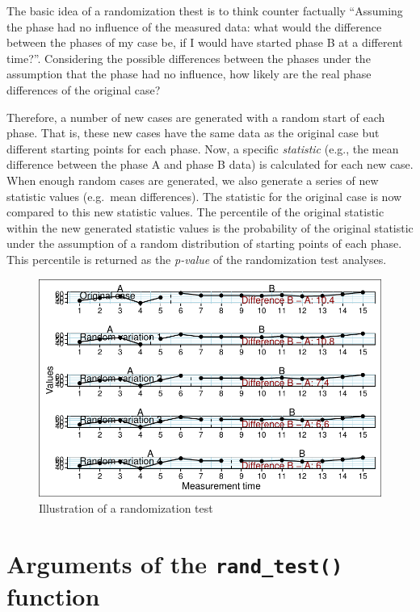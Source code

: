 \documentclass[
  letterpaper,
  DIV=11,
  numbers=noendperiod]{scrreprt}
\begin{document}
The basic idea of a randomization thest is to think counter factually
``Assuming the phase had no influence of the measured data: what would
the difference between the phases of my case be, if I would have started
phase B at a different time?''. Considering the possible differences
between the phases under the assumption that the phase had no influence,
how likely are the real phase differences of the original case?

Therefore, a number of new cases are generated with a random start of
each phase. That is, these new cases have the same data as the original
case but different starting points for each phase. Now, a specific
\emph{statistic} (e.g., the mean difference between the phase A and
phase B data) is calculated for each new case. When enough random cases
are generated, we also generate a series of new statistic values
(e.g.~mean differences). The statistic for the original case is now
compared to this new statistic values. The percentile of the original
statistic within the new generated statistic values is the probability
of the original statistic under the assumption of a random distribution
of starting points of each phase. This percentile is returned as the
\emph{p-value} of the randomization test analyses.

\begin{figure}

{\centering \includegraphics{./ch_randomization_test_files/figure-pdf/fig-ex-rand-test-1.pdf}

}

\caption{\label{fig-ex-rand-test}Illustration of a randomization test}

\end{figure}

\hypertarget{arguments-of-the-rand_test-function}{%
\section{\texorpdfstring{Arguments of the \texttt{rand\_test()}
function}{Arguments of the rand\_test() function}}\label{arguments-of-the-rand_test-function}}
\end{document}
